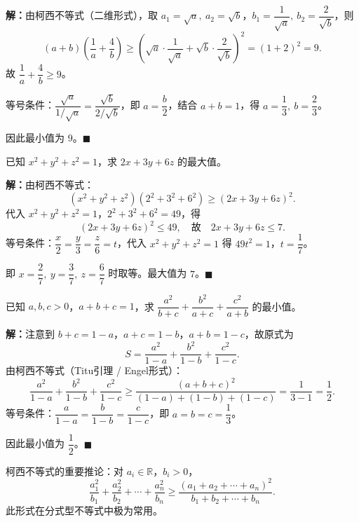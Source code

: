 \documentclass[12pt, a4paper]{ctexart}
\begin{document}
\textbf{解：}由柯西不等式（二维形式），取 $a_1 = \sqrt{a},\ a_2 = \sqrt{b}$，$b_1 = \dfrac{1}{\sqrt{a}},\ b_2 = \dfrac{2}{\sqrt{b}}$，则
\[
  (a + b)\!\left(\frac{1}{a} + \frac{4}{b}\right) \geqslant \left(\sqrt{a} \cdot \frac{1}{\sqrt{a}} + \sqrt{b} \cdot \frac{2}{\sqrt{b}}\right)^2 = (1 + 2)^2 = 9.
\]
故 $\dfrac{1}{a} + \dfrac{4}{b} \geqslant 9$。

等号条件：$\dfrac{\sqrt{a}}{1/\sqrt{a}} = \dfrac{\sqrt{b}}{2/\sqrt{b}}$，即 $a = \dfrac{b}{2}$，结合 $a + b = 1$，得 $a = \dfrac{1}{3},\ b = \dfrac{2}{3}$。

因此最小值为 $\boxed{9}$。\hfill $\blacksquare$

\begin{examplebox}[【例题2】柯西不等式求条件极值]
已知 $x^2 + y^2 + z^2 = 1$，求 $2x + 3y + 6z$ 的最大值。
\end{examplebox}

\textbf{解：}由柯西不等式：
\[
  (x^2 + y^2 + z^2)(2^2 + 3^2 + 6^2) \geqslant (2x + 3y + 6z)^2.
\]
代入 $x^2 + y^2 + z^2 = 1$，$2^2 + 3^2 + 6^2 = 49$，得
\[
  (2x + 3y + 6z)^2 \leqslant 49, \quad \text{故}\quad 2x + 3y + 6z \leqslant 7.
\]
等号条件：$\dfrac{x}{2} = \dfrac{y}{3} = \dfrac{z}{6} = t$，代入 $x^2 + y^2 + z^2 = 1$ 得 $49t^2 = 1$，$t = \dfrac{1}{7}$。

即 $x = \dfrac{2}{7},\ y = \dfrac{3}{7},\ z = \dfrac{6}{7}$ 时取等。最大值为 $\boxed{7}$。\hfill $\blacksquare$

\begin{examplebox}[【例题3】三维柯西不等式]
已知 $a, b, c > 0$，$a + b + c = 1$，求 $\dfrac{a^2}{b+c} + \dfrac{b^2}{a+c} + \dfrac{c^2}{a+b}$ 的最小值。
\end{examplebox}

\textbf{解：}注意到 $b + c = 1 - a$，$a + c = 1 - b$，$a + b = 1 - c$，故原式为
\[
  S = \frac{a^2}{1-a} + \frac{b^2}{1-b} + \frac{c^2}{1-c}.
\]
由柯西不等式（Titu引理 / Engel形式）：
\[
  \frac{a^2}{1-a} + \frac{b^2}{1-b} + \frac{c^2}{1-c} \geqslant \frac{(a+b+c)^2}{(1-a)+(1-b)+(1-c)} = \frac{1}{3-1} = \frac{1}{2}.
\]
等号条件：$\dfrac{a}{1-a} = \dfrac{b}{1-b} = \dfrac{c}{1-c}$，即 $a = b = c = \dfrac{1}{3}$。

因此最小值为 $\boxed{\dfrac{1}{2}}$。\hfill $\blacksquare$

\begin{tipbox}
柯西不等式的重要推论：对 $a_i \in \mathbb{R}$，$b_i > 0$，
\[
  \frac{a_1^2}{b_1} + \frac{a_2^2}{b_2} + \cdots + \frac{a_n^2}{b_n} \geqslant \frac{(a_1 + a_2 + \cdots + a_n)^2}{b_1 + b_2 + \cdots + b_n}.
\]
此形式在分式型不等式中极为常用。
\end{tipbox}
\end{document}
